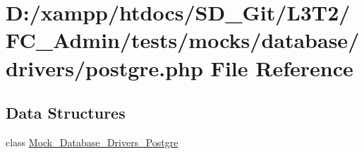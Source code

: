 \hypertarget{postgre_8php}{}\section{D\+:/xampp/htdocs/\+S\+D\+\_\+\+Git/\+L3\+T2/\+F\+C\+\_\+\+Admin/tests/mocks/database/drivers/postgre.php File Reference}
\label{postgre_8php}
\subsection*{Data Structures}
\begin{DoxyCompactItemize}
\item 
class \hyperlink{class_mock___database___drivers___postgre}{Mock\+\_\+\+Database\+\_\+\+Drivers\+\_\+\+Postgre}
\end{DoxyCompactItemize}
